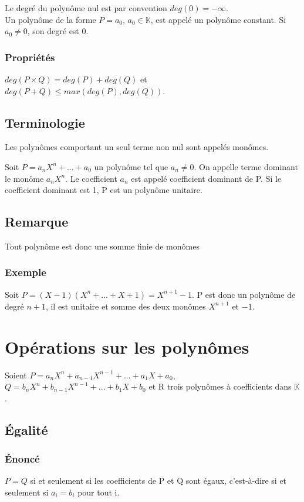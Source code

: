 \documentclass[a4paper,10pt]{book} %
\newcommand{\K}{\mathbb{K}}
\begin{document}
Le degré du polynôme nul est par convention $deg(0)=-\infty$.\\

Un polynôme de la forme $P=a_{0}$, $a_{0} \in \K$, est appelé un polynôme constant. Si $a_{0}\neq 0$, son degré est 0.

\subsubsection{Propriétés}
$deg(P\times Q)=deg(P)+deg(Q)$ et $deg(P+Q)\leq max(deg(P),deg(Q))$.

\subsection{Terminologie}
Les polynômes comportant un seul terme non nul sont appelés monômes.

Soit $P=a_{n}X^{n}+...+a_{0}$ un polynôme tel que $a_{n} \neq 0$. On appelle terme dominant le monôme $a_{n}X^{n}$. Le coefficient $a_{n}$ est appelé coefficient dominant de P.
Si le coefficient dominant est 1, P est un polynôme unitaire.

\subsection{Remarque}
Tout polynôme est donc une somme finie de monômes
\subsubsection{Exemple}
Soit $P=(X-1)(X^{n}+...+X+1)=X^{n+1}-1$. P est donc un polynôme de degré $n+1$, il est unitaire et somme des deux monômes $X^{n+1}$ et $-1$.

\section{Opérations sur les polynômes}
Soient $P=a_{n}X^{n}+a_{n-1}X^{n-1}+...+a_{1}X+a_{0}$, $Q=b_{n}X^{n}+b_{n-1}X^{n-1}+...+b_{1}X+b_{0}$ et R trois polynômes à coefficients dans $\K$.\\

\subsection{Égalité}
\subsubsection{Énoncé}
$P=Q$ si et seulement si les coefficients de P et Q sont égaux, c'est-à-dire si et seulement si $a_{i}=b_{i}$ pour tout i.\\
\end{document}
